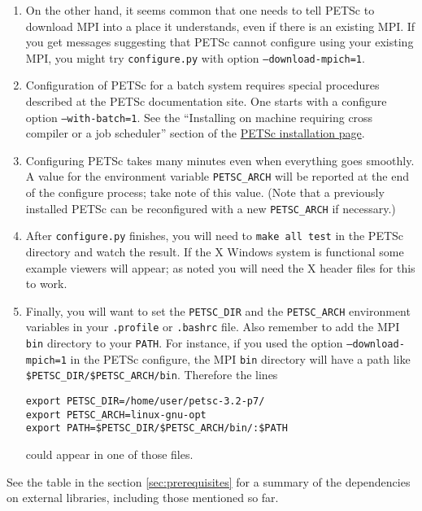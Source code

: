 \documentclass[titlepage,letterpaper,final]{scrartcl}
\begin{document}
\begin{enumerate}
\begin{enumerate}
\item On the other hand, it seems common that one needs to tell PETSc to download MPI into a place it understands, even if there is an existing MPI.  If you get messages suggesting that PETSc cannot configure using your existing MPI, you might try \texttt{configure.py} with option \texttt{--download-mpich=1}.

\item Configuration of PETSc for a batch system requires special procedures described at the PETSc documentation site.  One starts with a configure option \texttt{--with-batch=1}.  See the ``Installing on machine requiring cross compiler or a job scheduler'' section of the \href{http://www-unix.mcs.anl.gov/petsc/petsc-2/documentation/installation.html}{PETSc installation page}.

\item  Configuring PETSc takes many minutes even when everything goes smoothly.   A value for the environment variable \texttt{PETSC_ARCH} will be reported at the end of the configure process; take note of this value.  (Note that a previously installed PETSc can be reconfigured with a new \texttt{PETSC_ARCH} if necessary.)

\item  After \texttt{configure.py} finishes, you will need to \texttt{make all test} in the PETSc directory and watch the result.  If the X Windows system is functional some example viewers will appear; as noted you will need the X header files for this to work.

\item Finally, you will want to set the \texttt{PETSC_DIR} and the \texttt{PETSC_ARCH} environment variables in your \texttt{.profile} or \texttt{.bashrc} file.  Also remember to add the MPI \texttt{bin} directory to your \texttt{PATH}.  For instance, if you used the option \texttt{--download-mpich=1} in the PETSc configure, the MPI \texttt{bin} directory will have a path like \texttt{\$PETSC_DIR/\$PETSC_ARCH/bin}.  Therefore the lines 
\begin{verbatim}
export PETSC_DIR=/home/user/petsc-3.2-p7/
export PETSC_ARCH=linux-gnu-opt
export PATH=$PETSC_DIR/$PETSC_ARCH/bin/:$PATH
\end{verbatim}
\noindent could appear in one of those files.
\end{enumerate}
\end{enumerate}
\medskip See the table in the section \ref{sec:prerequisites} for a summary of the dependencies on external libraries, including
those mentioned so far.
\end{document}
